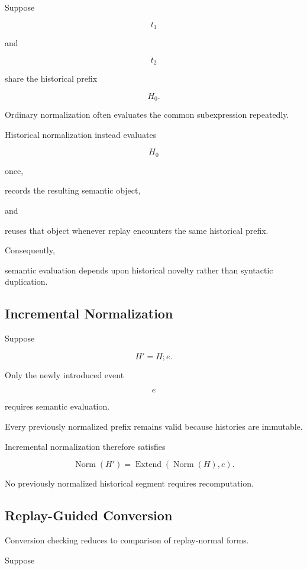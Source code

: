 \documentclass[12pt,oneside]{article}
\theoremstyle{definition}
\theoremstyle{remark}
\begin{document}
Suppose

\[
t_1
\]

and

\[
t_2
\]

share the historical prefix

\[
H_0.
\]

Ordinary normalization often evaluates the common subexpression repeatedly.

Historical normalization instead evaluates

\[
H_0
\]

once,

records the resulting semantic object,

and

reuses that object whenever replay encounters the same historical prefix.

Consequently,

semantic evaluation depends upon historical novelty rather than syntactic
duplication.


\subsection{Incremental Normalization}

Suppose

\[
H'
=
H;
e.
\]

Only the newly introduced event

\[
e
\]

requires semantic evaluation.

Every previously normalized prefix remains valid because histories are
immutable.

Incremental normalization therefore satisfies

\[
\operatorname{Norm}(H')
=
\operatorname{Extend}
(
\operatorname{Norm}(H),
e
).
\]

No previously normalized historical segment requires recomputation.


\subsection{Replay-Guided Conversion}

Conversion checking reduces to comparison of replay-normal forms.

Suppose
\end{document}
